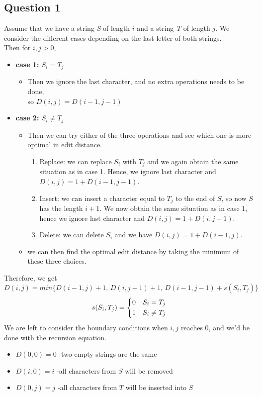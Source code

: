 \documentclass[10pt]{article}
\begin{document}
\subsection*{Question 1}
Assume that we have a string \textit{S} of length $i$ and a string \textit{T} of length $j$. We consider the different cases depending on the last letter of both strings.\\
Then for $i,j>0$,
\begin{itemize}
    \item \textbf{case 1: $S_i=T_j$}
    \begin{itemize}
    \item Then we ignore the last character, and no extra operations needs to be done,\\ so $D(i,j)=D(i-1,j-1)$
    \end{itemize}
    \item \textbf{case 2: $S_i \neq T_j$}
    \begin{itemize}
        \item Then we can try either of the three operations and see which one is more optimal in edit distance.
        \begin{enumerate}
            \item Replace: we can replace $S_i$ with $T_j$ and we again obtain the same situation as in case 1. Hence, we ignore last character and $D(i,j)=1+D(i-1,j-1)$.
            \item Insert: we can insert a character equal to $T_j$ to the end of $S$, so now $S$ has the length $i+1$. We now obtain the same situation as in case 1, hence we ignore last character and $D(i,j)= 1 + D(i,j-1)$.
            \item Delete: we can delete $S_i$ and we have $D(i,j)=1+D(i-1,j)$.
        \end{enumerate}
        \item we can then find the optimal edit distance by taking the minimum of these three choices.
    \end{itemize}
\end{itemize}
Therefore, we get
\[D(i,j)=min\{D(i-1,j)+1,\,D(i,j-1)+1,\,D(i-1,j-1)+s(S_i,T_j)\}\]
\[  s(S_i,T_j)=
    \begin{dcases}
        0 & S_i = T_j \\
        1 & S_i \neq T_j\\
    \end{dcases}
\]
\newpage
\noindent We are left to consider the boundary conditions when $i,j$ reaches $0$, and we'd be done with the recursion equation.
\begin{itemize}
    \item $D(0,0)=0$ -two empty strings are the same
    \item $D(i,0)=i$ -all characters from $S$ will be removed
    \item $D(0,j)=j$ -all characters from $T$ will be inserted into $S$
\end{itemize}
\bigskip
\end{document}
